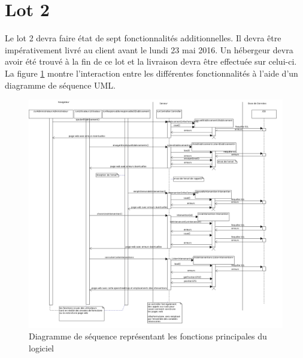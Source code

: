 \section{Lot 2}
	Le lot 2 devra faire état de sept fonctionnalités additionnelles. Il devra être impérativement livré au client avant le lundi 23 mai 2016. Un hébergeur devra avoir été trouvé à la fin de ce lot et la livraison devra être effectuée sur celui-ci.\\
	
	La figure \ref{fonctPrinc} montre l’interaction entre les différentes fonctionnalités à l'aide d'un diagramme de séquence UML.

\begin{figure}[H]
	\begin{center}
	\includegraphics[scale=0.3]{images/fonctionsPrincipales.png}
	\caption{\label{fonctPrinc} Diagramme de séquence représentant les fonctions principales du logiciel}
	\end{center}
\end{figure}
















 




